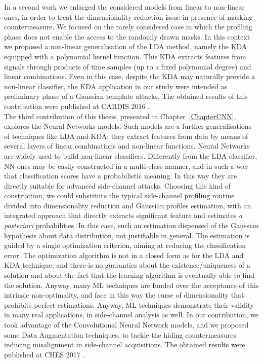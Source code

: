 In a second work we enlarged the considered models from linear to non-linear ones, in order to treat the dimensionality reduction issue in presence of masking countermeasure. We focused on the rarely considered case in which the profiling phase does not enable the access to the randomly drawn masks. In this context we proposed a non-linear generalisation  of the LDA method, namely the KDA equipped with a polynomial kernel function. This KDA extracts features from signals through products of time samples (up to a fixed polynomial degree) and linear combinations. Even in this case, despite the KDA may naturally provide a non-linear classifier, the KDA application in our study were intended as preliminary phase of a Gaussian template attacks. The obtained results of this contribution were published at CARDIS 2016 \cite{cagli2016kernel}.\\


 The third contribution of this thesis, presented in Chapter~\ref{ChapterCNN}, explores the Neural Networks models. Such models are a further generalisations of techniques like LDA and KDA: they extract features from data by means of several layers of linear combinations and non-linear functions. Neural Networks are widely used to build non-linear classifiers. Differently from the LDA classifier, NN ones may be easily constructed in a multi-class manner, and in such a way that classification scores have a probabilistic meaning. In this way they are directly suitable for advanced side-channel attacks. Choosing this kind of construction, we could substitute the typical side-channel profiling routine divided into dimensionality reduction and Gaussian profiles estimation, with an integrated approach that directly extracts significant feature and estimates \textit{a posteriori} probabilities. In this case, such an estimation dispensed of the Gaussian hypothesis about data distribution, not justifiable in general. The estimation is guided by a single optimization criterion, aiming at reducing the classification error. The optimization algorithm is not in a closed form as for the LDA and KDA technique, and there is no guaranties about the existence/uniqueness of a solution and about the fact that the learning algorithm is eventually able to find the solution. Anyway, many ML techniques are funded over the acceptance of this intrinsic non-optimality, and face in this way the curse of dimensionality that prohibits perfect estimations. Anyway, ML techniques demonstrate their validity in many real applications, in side-channel analysis as well. In our contribution, we took advantage of the Convolutional Neural Network models, and we proposed some Data Augmentation techniques, to tackle the hiding countermeasures inducing misalignment in side-channel acquisitions. The obtained results were published at CHES 2017 \cite{DBLP:conf/ches/CagliDP17}.\\
 




